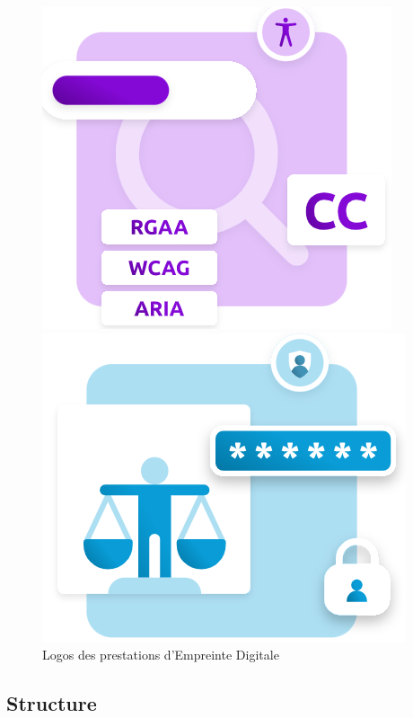 \documentclass[12pt, a4paper, twoside]{article}
\begin{document}
\begin{figure}[!ht]
\begin{minipage}{.25\textwidth}
    \begin{center}
        \includegraphics[scale=0.4]{src/logo_accessibilite.png}
    \end{center}
\end{minipage}%
\hfill
\begin{minipage}{.25\textwidth}%
\begin{center}
    \includegraphics[scale=0.4]{src/logo_rgpd.png}
\end{center}
\end{minipage}%
    \label{fig:logo_ed}
    \caption{Logos des prestations d'Empreinte Digitale}
\end{figure}


\subsection{Structure}
\end{document}
